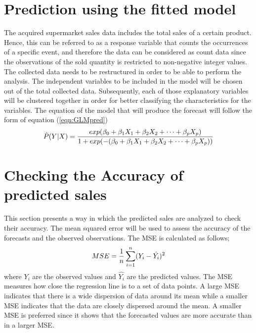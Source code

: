 \section{Prediction using the fitted model}
The acquired supermarket sales data includes the total sales of a certain product. Hence, this can be referred to as a response variable that counts the occurrences of a specific event, and therefore the data can be considered as count data since the observations of the sold quantity is restricted to non-negative integer values. %
The collected data needs to be restructured in order to be able to perform the analysis. The independent variables to be included in the model will be chosen out of the total collected data. Subsequently, each of those explanatory variables will be clustered together in order for better classifying the characteristics for the variables. The equation of the model that will produce the forecast will follow the form of equation (\ref{eqn:GLMpred})
\begin{equation}
	\centering
	\label{eqn:GLMpred}
	\hat{P}(Y|X) = \frac{exp ( \beta_0 + \beta_{1} X_{1} + \beta_{2} X_{2} + \cdots +\beta_{p} X_{p})}{1+ exp (-( \beta_0 + \beta_{1} X_{1} + \beta_{2} X_{2} + \cdots +\beta_{p} X_{p}))}
\end{equation}
\section{Checking the Accuracy of predicted sales}
This section presents a way in which the predicted sales are analyzed to check their accuracy.
The mean squared error will be used to assess the accuracy of the forecasts and the observed observations. The MSE is calculated as follows;
\begin{equation}
	\centering
	\label{eqn:MSE}
	MSE = \frac{1}{n} \sum_{i=1}^{n}(Y_{i}-\hat{Y_{i}})^2
\end{equation}
where $Y_{i}$ are the observed values and $\hat{Y_{i}}$ are the predicted values. The MSE measures how close the regression line is to a set of data points. A large MSE indicates that there is a wide dispersion of data around its mean while a smaller MSE indicates that the data are closely dispersed around the mean. A smaller MSE is preferred since it shows that the forecasted values are more accurate than in a larger MSE.

